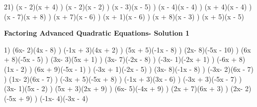 \documentclass{article}%
\begin{document}
21) (x - 2)(x + 4)%
) (x - 2)(x - 2)%
) (x - 3)(x - 5)%
) (x - 4)(x - 4)%
) (x + 4)(x - 4)%
) (x - 7)(x + 8)%
) (x + 7)(x - 6)%
) (x + 1)(x - 6)%
) (x + 8)(x - 3)%
) (x + 5)(x - 5)%
\newline%
\newpage%
\large%
\begin{center}%
\textbf{Factoring Advanced Quadratic Equations- Solution 1}%
\newline%
\end{center} \normalsize%
1) (6x- 2)(4x - 8)%
) (-1x + 3)(4x + 2)%
) (5x + 5)(-1x - 8)%
) (2x- 8)(-5x - 10)%
) (6x + 8)(-5x - 5)%
) (3x- 3)(5x + 1)%
) (3x- 7)(-2x - 8)%
) (-3x- 1)(-2x + 1)%
) (-6x + 8)(1x - 2)%
) (6x + 9)(-5x - 1)%
) (-3x + 1)(-2x - 5)%
) (3x- 8)(-1x - 8)%
) (-3x- 2)(6x - 7)%
) (1x- 2)(6x - 7)%
) (-3x + 5)(-5x + 8)%
) (-1x + 3)(3x - 6)%
) (-3x + 3)(-5x - 7)%
) (3x- 1)(5x - 2)%
) (5x + 3)(2x + 9)%
) (6x- 5)(-4x + 9)%
) (2x + 7)(6x + 3)%
) (2x- 2)(-5x + 9)%
) (-1x- 4)(-3x - 4)%
\newline%
\end{document}
